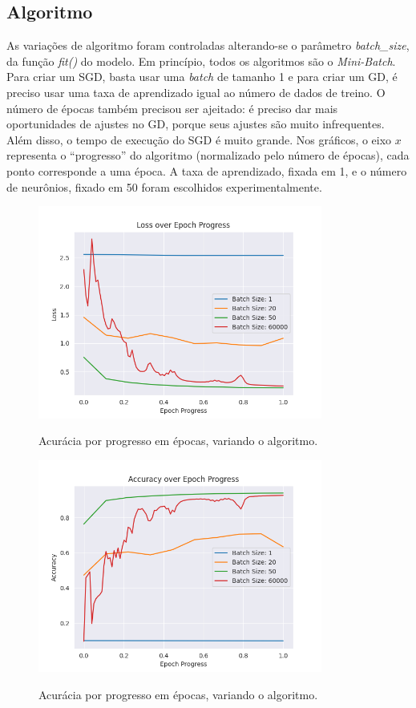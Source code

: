 \documentclass[a4paper]{article}
\begin{document}
\subsection{Algoritmo}%
\label{sub:Algoritmo}

As variações de algoritmo foram controladas alterando-se o parâmetro \textit{batch\_size}, da função \textit{fit()} do modelo. Em princípio, todos os algoritmos são o \textit{Mini-Batch}. Para criar um SGD, basta usar uma \textit{batch} de tamanho 1 e para criar um GD, é preciso usar uma taxa de aprendizado igual ao número de dados de treino. O número de épocas também precisou ser ajeitado: é preciso dar mais oportunidades de ajustes no GD, porque seus ajustes são muito infrequentes. Além disso, o tempo de execução do SGD é muito grande. Nos gráficos, o eixo $x$ representa o “progresso” do algoritmo (normalizado pelo número de épocas), cada ponto corresponde a uma época. A taxa de aprendizado, fixada em 1, e o número de neurônios, fixado em 50 foram escolhidos experimentalmente.

\begin{figure}[H]
  \begin{center}
  {\includegraphics[height=7cm]{./images/Loss_over_Epoch_Progress.png}}
  \end{center}
  \caption{Acurácia por progresso em épocas, variando o algoritmo. \label{fig:lep}}
\end{figure}

\begin{figure}[H]
  \begin{center}
  {\includegraphics[height=7cm]{./images/Accuracy_over_Epoch_Progress.png}}
  \end{center}
  \caption{Acurácia por progresso em épocas, variando o algoritmo.\label{fig:aep}}
\end{figure}
\end{document}
